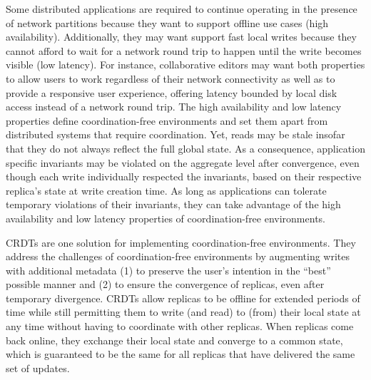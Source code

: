 Some distributed applications are required to continue operating in the presence of
network partitions because they want to support offline use cases (high availability).
Additionally, they may want support fast local writes because they cannot afford
to wait for a network round trip to happen until the write becomes
visible (low latency).
For instance, collaborative editors may want both properties to allow users
to work regardless of their network connectivity as well as to provide a
responsive user experience, offering latency bounded by local disk access instead
of a network round trip.
The high availability and low latency properties define coordination-free
environments and set them apart from distributed systems that require coordination.
Yet, reads may be stale insofar that they do not always reflect the full global state.
As a consequence, application specific invariants may be violated on the aggregate
level after convergence, even though each write individually respected the invariants,
based on their respective replica's state at write creation time.
As long as applications can tolerate temporary violations of their invariants,
they can take advantage of the high availability and low latency properties
of coordination-free environments.

\acfp{CRDT}\footnotemark{} are one solution for implementing coordination-free
environments.
They address the challenges of coordination-free environments by augmenting
writes with additional metadata (1) to preserve the user's intention
in the ``best'' possible manner and (2) to ensure the convergence of replicas,
even after temporary divergence.
\acp{CRDT} allow replicas to be offline for extended periods of time
while still permitting them to write (and read) to (from) their local state
at any time without having to coordinate with other replicas.
When replicas come back online, they exchange their local state
and converge to a common state, which is guaranteed to be the same for all
replicas that have delivered the same set of updates.



